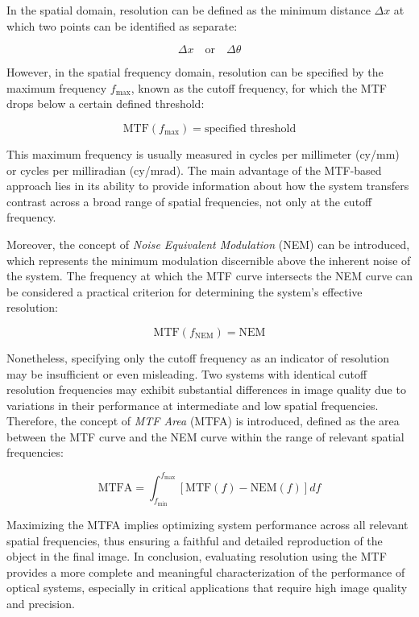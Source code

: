In the spatial domain, resolution can be defined as the minimum distance \(\Delta x\) at which two points can be identified as separate:

\begin{equation}
\Delta x \quad \text{or} \quad \Delta \theta
\end{equation}

However, in the spatial frequency domain, resolution can be specified by the maximum frequency \(f_{\text{max}}\), known as the cutoff frequency, for which the MTF drops below a certain defined threshold:

\begin{equation}
\text{MTF}(f_{\text{max}}) = \text{specified threshold}
\end{equation}

This maximum frequency is usually measured in cycles per millimeter (cy/mm) or cycles per milliradian (cy/mrad). The main advantage of the MTF-based approach lies in its ability to provide information about how the system transfers contrast across a broad range of spatial frequencies, not only at the cutoff frequency.

Moreover, the concept of \textit{Noise Equivalent Modulation} (NEM) can be introduced, which represents the minimum modulation discernible above the inherent noise of the system. The frequency at which the MTF curve intersects the NEM curve can be considered a practical criterion for determining the system’s effective resolution:

\begin{equation}
\text{MTF}(f_{\text{NEM}}) = \text{NEM}
\end{equation}

Nonetheless, specifying only the cutoff frequency as an indicator of resolution may be insufficient or even misleading. Two systems with identical cutoff resolution frequencies may exhibit substantial differences in image quality due to variations in their performance at intermediate and low spatial frequencies. Therefore, the concept of \textit{MTF Area} (MTFA) is introduced, defined as the area between the MTF curve and the NEM curve within the range of relevant spatial frequencies:

\begin{equation}
\text{MTFA} = \int_{f_{\text{min}}}^{f_{\text{max}}} \left[\text{MTF}(f) - \text{NEM}(f)\right] df
\end{equation}

Maximizing the MTFA implies optimizing system performance across all relevant spatial frequencies, thus ensuring a faithful and detailed reproduction of the object in the final image. In conclusion, evaluating resolution using the MTF provides a more complete and meaningful characterization of the performance of optical systems, especially in critical applications that require high image quality and precision.

